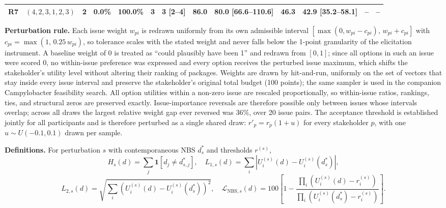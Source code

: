 \documentclass[9pt,a4paper]{article}
\newcommand{\NBS}{\mathrm{NBS}}
\begin{document}
\begin{landscape}
\begin{tabular}{@{}llccc|cc|cc|cc|cc@{}}
R7 & $(4,2,3,1,2,3)$ & 2 & 0.0\% & 100.0\% & 3 & 3 [2--4] & 86.0 & 80.0 [66.6--110.6] & 46.3 & 42.9 [35.2--58.1] & -- & --\\
\bottomrule
\end{tabular}
\par\raggedright\vspace{2mm}
\textbf{Perturbation rule.} Each issue weight $w_{pi}$ is redrawn uniformly from its own admissible interval $[\max(0,w_{pi}-c_{pi}),\,w_{pi}+c_{pi}]$ with $c_{pi}=\max(1,\,0.25\,w_{pi})$, so tolerance scales with the stated weight and never falls below the 1-point granularity of the elicitation instrument. A baseline weight of $0$ is treated as ``could plausibly have been 1'' and redrawn from $[0,1]$; since all options in such an issue were scored $0$, no within-issue preference was expressed and every option receives the perturbed issue maximum, which shifts the stakeholder's utility level without altering their ranking of packages. Weights are drawn by hit-and-run, uniformly on the set of vectors that stay inside every issue interval and preserve the stakeholder's original total budget (100 points); the same sampler is used in the companion Campylobacter feasibility search. All option utilities within a non-zero issue are rescaled proportionally, so within-issue ratios, rankings, ties, and structural zeros are preserved exactly. Issue-importance reversals are therefore possible only between issues whose intervals overlap; across all draws the largest relative weight gap ever reversed was 36\%, over 20 issue pairs. The acceptance threshold is established jointly for all participants and is therefore perturbed as a single shared draw: $r'_p=r_p(1+u)$ for every stakeholder $p$, with one $u\sim U(-0.1,0.1)$ drawn per sample.
\par\vspace{1mm}
\textbf{Definitions.} For perturbation $s$ with contemporaneous NBS $d_s^*$ and thresholds $r^{(s)}$,
\[H_s(d)=\sum_j \mathbf 1[d_j\neq d^*_{s,j}],\quad L_{1,s}(d)=\sum_i|U_i^{(s)}(d)-U_i^{(s)}(d_s^*)|,\]
\[L_{2,s}(d)=\sqrt{\sum_i\left(U_i^{(s)}(d)-U_i^{(s)}(d_s^*)\right)^2},\quad
\mathcal L_{\NBS,s}(d)=100\left[1-\frac{\prod_i\left(U_i^{(s)}(d)-r_i^{(s)}\right)}{\prod_i\left(U_i^{(s)}(d_s^*)-r_i^{(s)}\right)}\right].\]

\end{landscape}
\end{document}

